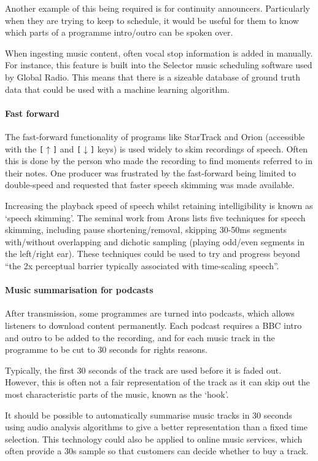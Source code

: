 Another example of this being required is for continuity announcers.
Particularly when they are trying to keep to schedule, it would be useful for
them to know which parts of a programme intro/outro can be spoken over.

When ingesting music content, often vocal stop information is added in
manually. For instance, this feature is built into the Selector music
scheduling software used by Global Radio. This means that there is a sizeable
database of ground truth data that could be used with a machine learning
algorithm.

\paragraph{Fast forward}
The fast-forward functionality of programs like StarTrack and Orion (accessible
with the \texttt{[$\uparrow$]} and \texttt{[$\downarrow$]} keys) is used widely
to skim recordings of speech. Often this is done by the person who made the
recording to find moments referred to in their notes. One producer was
frustrated by the fast-forward being limited to double-speed and requested that
faster speech skimming was made available.

Increasing the playback speed of speech whilst retaining intelligibility is
known as `speech skimming'. The seminal work from Arons \cite{Arons1997} lists
five techniques for speech skimming, including pause shortening/removal,
skipping 30-50ms segments with/without overlapping and dichotic sampling
(playing odd/even segments in the left/right ear). These techniques could be
used to try and progress beyond ``the 2x perceptual barrier typically
associated with time-scaling speech''.

\paragraph{Music summarisation for podcasts}
After transmission, some programmes are turned into podcasts, which allows
listeners to download content permanently. Each podcast requires a BBC intro
and outro to be added to the recording, and for each music track in the
programme to be cut to 30 seconds for rights reasons.

Typically, the first 30 seconds of the track are used before it is faded out.
However, this is often not a fair representation of the track as it can skip
out the most characteristic parts of the music, known as the `hook'.

It should be possible to automatically summarise music tracks in 30 seconds
using audio analysis algorithms to give a better representation than a fixed
time selection. This technology could also be applied to online music services,
which often provide a 30s sample so that customers can decide whether to buy a
track.

